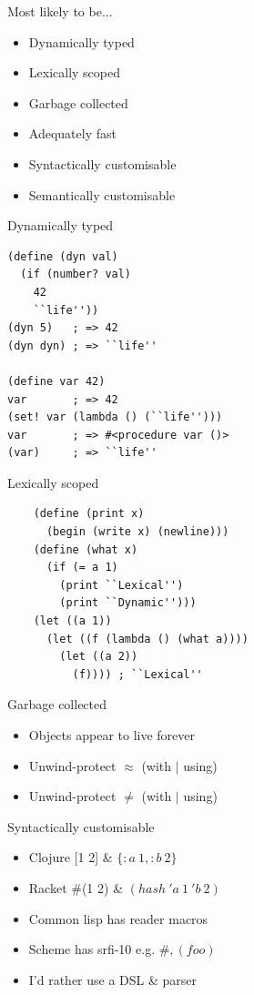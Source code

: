 \documentclass[20pt]{beamer}
\begin{document}
\begin{frame}{Most likely to be...}
  \begin{itemize}
  \item Dynamically typed
  \item Lexically scoped
  \item Garbage collected
  \item Adequately fast
  \item Syntactically customisable
  \item Semantically customisable
  \end{itemize}
\end{frame}

\begin{frame}[fragile]{Dynamically typed}
  \begin{lstlisting}
(define (dyn val)
  (if (number? val)
    42
    ``life''))
(dyn 5)   ; => 42
(dyn dyn) ; => ``life''

(define var 42)
var       ; => 42
(set! var (lambda () (``life'')))
var       ; => #<procedure var ()>
(var)     ; => ``life''
  \end{lstlisting}
\end{frame}

\begin{frame}[fragile]{Lexically scoped}
  \begin{lstlisting}
    (define (print x)
      (begin (write x) (newline)))
    (define (what x)
      (if (= a 1)
        (print ``Lexical'')
        (print ``Dynamic'')))
    (let ((a 1))
      (let ((f (lambda () (what a))))
        (let ((a 2))
          (f)))) ; ``Lexical''
  \end{lstlisting}
\end{frame}

\begin{frame}{Garbage collected}
  \begin{itemize}
  \item Objects appear to live forever
  \item Unwind-protect $\approx$ (with $|$ using)
  \item Unwind-protect $\neq$ (with $|$ using)
  \end{itemize}
\end{frame}

\begin{frame}{Syntactically customisable}
  \begin{itemize}
  \item Clojure [1 2] \& $\{:a\ 1, :b\ 2\}$
  \item Racket \#(1 2) \& $(hash\ 'a\ 1\ 'b\ 2)$
  \item Common lisp has reader macros
  \item Scheme has srfi-10 e.g. $\#,(foo)$
  \item I'd rather use a DSL \& parser
  \end{itemize}
\end{frame}
\end{document}
